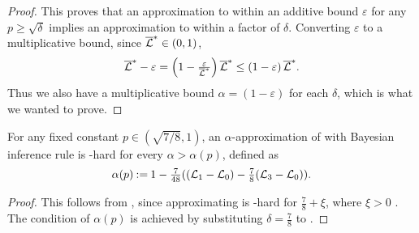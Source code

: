 \begin{proof}
    This proves that an approximation to \netlearnopt{} within an additive bound $ \varepsilon $ for any $ p \geq \sqrt \delta$ implies an approximation to \maxsat{} within a factor of $\delta$. 
    Converting $\varepsilon$ to a multiplicative bound, since $ \overline{\mathcal{L}}^* \in (0,1) $, \[
        \overline{\mathcal{L}}^* - \varepsilon = \left( 1- \tfrac{\varepsilon}{\overline{\mathcal{L}}^*} \right)\overline{\mathcal{L}}^* \leq \left( 1-\varepsilon \right) \overline{\mathcal{L}}^*.
    \]
    Thus we also have a multiplicative bound $ \alpha = (1-\varepsilon) $ for each $ \delta $, which is what we wanted to prove. 
\end{proof}


\begin{corollary}[ ]
    For any fixed constant $ p \in (\sqrt{ {7}/{8}}, 1) $, an $ \alpha $-approximation of \netlearnopt{} with Bayesian inference rule is \np-hard for every $ \alpha > \alpha(p) $, defined as \[
        \alpha(p) \mathbin{:=} 1-\tfrac{7}{48}( (\mathcal{L}_1 - \mathcal{L}_0)-\tfrac 78(\mathcal{L}_3 - \mathcal{L}_0)).
    \]
\end{corollary}

\begin{proof}
    This follows from , since approximating \maxsat{} is \np-hard for $ \frac 78 + \xi $, where $ \xi > 0 $ \cite{Hastad2001-fg}.
    The condition of $ \alpha(p) $ is achieved by substituting $ \delta = \frac 78 $ to .
\end{proof}



